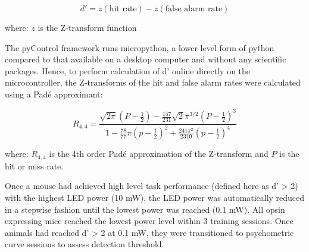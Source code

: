\begin{equation}
d' = z(\text{hit rate}) - z(\text{false alarm rate})
\end{equation}

where: $z$ is the Z-transform function

The pyControl framework runs micropython, a lower level form of python compared to that available on a desktop computer and without any scientific packages. Hence, to perform calculation of d' online directly on the microcontroller, the Z-transforms of the hit and false alarm rates were calculated using a Pad\'e approximant:

\begin{equation} \label{eq:pade}
 R_{4,4} = \frac{\sqrt{2\pi}(P - \frac{1}{2}) - \frac{157}{231}\sqrt{2}\pi^{3/2}(P - \frac{1}{2})^{3}}{1-\frac{78}{77}\pi(p-\frac{1}{2})^{2} + \frac{241\pi^{2}}{2310}(p - \frac{1}{2})^{4}}
\end{equation}

where: $R_{4,4}$ is the 4th order Pad\'e approximation of the Z-transform and $P$ is the hit or miss rate.

Once a mouse had achieved high level task performance (defined here as d' > 2) with the highest LED power (10 mW), the LED power was automatically reduced in a stepwise fashion until the lowest power was reached (0.1 mW). All opsin expressing mice reached the lowest power level within 3 training sessions. Once animals had reached d' > 2 at 0.1 mW, they were transitioned to psychometric curve sessions to assess detection threshold. 





